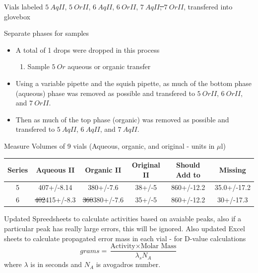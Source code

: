 \documentclass[idxtotoc,hyperref,openany,oneside]{labbook} %
\newcommand{\cmark}{\ding{51}}%
\newcommand{\done}{\rlap{$\square$}{\raisebox{2pt}{\large\hspace{1pt}\cmark}}%
  \hspace{-2.5pt}}
\begin{document}
\begin{todolist}
\item[\done]{Vials labeled $\boxed{5\ AqII}$, 
  $\boxed{5\ OrII}$, $\boxed{6\ AqII}$, $\boxed{6\ OrII}$,
  \st{$\boxed{7\ AqII}$, $\boxed{7\ OrII}$}, transfered into
  glovebox}
\item[\done]{Separate phases for samples}
  \begin{itemize}
  \item{A total of 1 drops were dropped in this process}
    \begin{enumerate}
    \item{Sample $\boxed{5\ Or}$ aqueous or organic transfer}
    \end{enumerate}
  \item{Using a variable pipette and the squish pipette,
    as much of the bottom phase (aqueous) phase was removed as possible
    and transfered to
    $\boxed{5\ OrII}$, $\boxed{6\ OrII}$, and \st{$\boxed{7\ OrII}$}.}
  \item{Then as much of the top phase (organic) was removed as
    possible and transfered
    to $\boxed{5\ AqII}$, $\boxed{6\ AqII}$, and \st{$\boxed{7\ AqII}$}.}
  \end{itemize}
\item[\done]{Measure Volumes of 9 vials (Aqueous, organic, and original
  - units in $\mu$l)}
\end{todolist}
\begin{center}
  \begin{tabular}{||c c c c c c||}
    \hline
    Series & Aqueous II & Organic II & Original II & Should Add to
    & Missing\\ [0.5ex]
    \hline\hline
    5 & 407+/-8.14 & 380+/-7.6 & 38+/-5 & 860+/-12.2 & 35.0+/-17.2\\
    \hline
    6 & \st{402}415+/-8.3 & \st{360}380+/-7.6 & 35+/-5 & 860+/-12.2
    & 30+/-17.3\\
    \hline
  \end{tabular}
\end{center}


\begin{todolist}
\item[\done]{Updated Spreedsheets to calculate
  activities based on avaiable peaks, also if
  a particular peak has really large errors,
  this will be ignored. Also updated Excel sheets
  to calculate propagated error mass in each vial
  - for D-value calculations}
  \begin{equation*}
    grams=\frac{\text{Activity}\times\text{Molar Mass}}
    {\lambda_sN_A}
  \end{equation*}
  where $\lambda$ is in seconds and $N_A$ is avogadros number.
\end{todolist}
\end{document}
